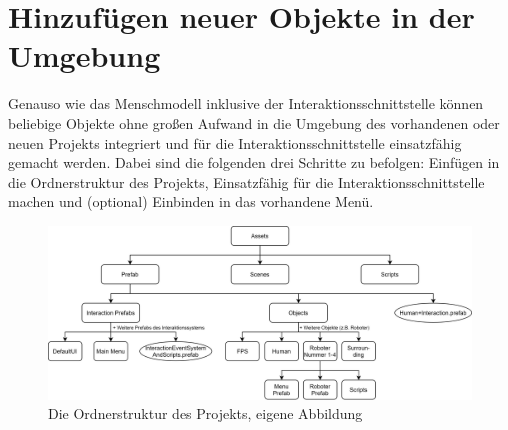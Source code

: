 \begin{enumerate}
\end{enumerate}

\section{Hinzufügen neuer Objekte in der Umgebung}\label{sec:ObjekteEinbinden}
Genauso wie das Menschmodell inklusive der Interaktionsschnittstelle können beliebige Objekte ohne großen Aufwand in die Umgebung des vorhandenen oder neuen Projekts integriert und für die Interaktionsschnittstelle einsatzfähig gemacht werden. Dabei sind die folgenden drei Schritte zu befolgen: Einfügen in die Ordnerstruktur des Projekts, Einsatzfähig für die Interaktionsschnittstelle machen und (optional) Einbinden in das vorhandene Menü.

\begin{figure}[h]
	\centering
	\includegraphics[width=1\linewidth]{Bilder/A54_Ordnerstruktur}
	\caption{Die Ordnerstruktur des Projekts, eigene Abbildung}
	\label{fig:Ordnerstruktur}
\end{figure}

